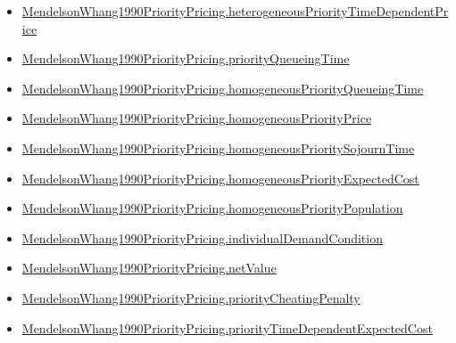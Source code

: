\documentclass[10pt]{article}
\begin{document}
\begin{itemize}[leftmargin=1.2em]
\begin{itemize}[leftmargin=1.2em]
\item \hyperlink{paper-prerequisite-d3f248a0395e1c76}{Mendelson\allowbreak{}Whang1990\allowbreak{}Priority\allowbreak{}Pricing.\allowbreak{}heterogeneous\allowbreak{}Priority\allowbreak{}Time\allowbreak{}Dependent\allowbreak{}Price}
\item \hyperlink{paper-prerequisite-49957d909aa24bc5}{Mendelson\allowbreak{}Whang1990\allowbreak{}Priority\allowbreak{}Pricing.\allowbreak{}priority\allowbreak{}Queueing\allowbreak{}Time}
\item \hyperlink{paper-prerequisite-69133735a09302ef}{Mendelson\allowbreak{}Whang1990\allowbreak{}Priority\allowbreak{}Pricing.\allowbreak{}homogeneous\allowbreak{}Priority\allowbreak{}Queueing\allowbreak{}Time}
\item \hyperlink{paper-prerequisite-3db4e2685735dcc0}{Mendelson\allowbreak{}Whang1990\allowbreak{}Priority\allowbreak{}Pricing.\allowbreak{}homogeneous\allowbreak{}Priority\allowbreak{}Price}
\item \hyperlink{paper-prerequisite-9c41d2efaf9290fc}{Mendelson\allowbreak{}Whang1990\allowbreak{}Priority\allowbreak{}Pricing.\allowbreak{}homogeneous\allowbreak{}Priority\allowbreak{}Sojourn\allowbreak{}Time}
\item \hyperlink{paper-prerequisite-53f58e4a79f3cd3c}{Mendelson\allowbreak{}Whang1990\allowbreak{}Priority\allowbreak{}Pricing.\allowbreak{}homogeneous\allowbreak{}Priority\allowbreak{}Expected\allowbreak{}Cost}
\item \hyperlink{paper-prerequisite-0efbdff1257f8766}{Mendelson\allowbreak{}Whang1990\allowbreak{}Priority\allowbreak{}Pricing.\allowbreak{}homogeneous\allowbreak{}Priority\allowbreak{}Population}
\item \hyperlink{paper-prerequisite-6c93de2469b53cb2}{Mendelson\allowbreak{}Whang1990\allowbreak{}Priority\allowbreak{}Pricing.\allowbreak{}individual\allowbreak{}Demand\allowbreak{}Condition}
\item \hyperlink{paper-prerequisite-7dbaca4145f3a4a5}{Mendelson\allowbreak{}Whang1990\allowbreak{}Priority\allowbreak{}Pricing.\allowbreak{}net\allowbreak{}Value}
\item \hyperlink{paper-prerequisite-54c5682d350b5d3d}{Mendelson\allowbreak{}Whang1990\allowbreak{}Priority\allowbreak{}Pricing.\allowbreak{}priority\allowbreak{}Cheating\allowbreak{}Penalty}
\item \hyperlink{paper-prerequisite-476808203e3008c1}{Mendelson\allowbreak{}Whang1990\allowbreak{}Priority\allowbreak{}Pricing.\allowbreak{}priority\allowbreak{}Time\allowbreak{}Dependent\allowbreak{}Expected\allowbreak{}Cost}

\end{itemize}
\end{itemize}
\end{document}
